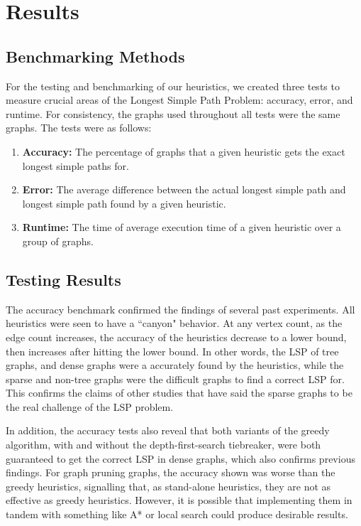 \documentclass[twocolumn,showpacs,%
  nofootinbib,aps,superscriptaddress,%
  eqsecnum,prd,notitlepage,showkeys,11pt]{article}
\begin{document}
\section{\centering Results}
\subsection{Benchmarking Methods}
For the testing and benchmarking of our heuristics, we created three tests to measure crucial areas of the Longest Simple Path Problem: accuracy, error, and runtime. For consistency, the graphs used throughout all tests were the same graphs. The tests were as follows:

\begin{enumerate}
    \item \textbf{Accuracy:} The percentage of graphs that a given heuristic gets the exact longest simple paths for.
    \item \textbf{Error:} The average difference between the actual longest simple path and longest simple path found by a given heuristic.
    \item \textbf{Runtime:} The time of average execution time of a given heuristic over a group of graphs.
\end{enumerate}

\subsection{Testing Results}
The accuracy benchmark confirmed the findings of several past experiments. All heuristics were seen to have a ``canyon" behavior. At any vertex count, as the edge count increases, the accuracy of the heuristics decrease to a lower bound, then increases after hitting the lower bound. In other words, the LSP of tree graphs, and dense graphs were a accurately found by the heuristics, while the sparse and non-tree graphs were the difficult graphs to find a correct LSP for. This confirms the claims of other studies that have said the sparse graphs to be the real challenge of the LSP problem. 

In addition, the accuracy tests also reveal that both variants of the greedy algorithm, with and without the depth-first-search tiebreaker, were both guaranteed to get the correct LSP in dense graphs, which also confirms previous findings. For graph pruning graphs, the accuracy shown was worse than the greedy heuristics, signalling that, as stand-alone heuristics, they are not as effective as greedy heuristics. However, it is possible that implementing them in tandem with something like A* or local search could produce desirable results.
\end{document}
